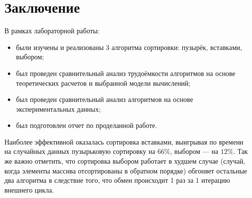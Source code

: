 \chapter*{Заключение}

В рамках лабораторной работы:
\begin{itemize}
	\item были изучены и реализованы 3 алгоритма сортировки: пузырёк, вставками, выбором;
	\item был проведен сравнительный анализ трудоёмкости алгоритмов на основе теоретических расчетов и выбранной модели вычислений;
	\item был проведен сравнительный анализ алгоритмов на основе экспериментальных данных;
    \item был подготовлен отчет по проделанной работе.
\end{itemize}

Наиболее эффективной оказалась сортировка вставками, выигрывая по времени на случайных данных пузырьковую сортировку на $66\%$, выбором — на $12\%$.
Так же важно отметить, что сортировка выбором работает в худшем случае (случай, когда элементы массива отсортированы в обратном порядке) обгоняет остальные два алгоритма в следствие того, что обмен происходит 1 раз за 1 итерацию внешнего цикла.
